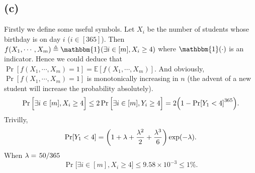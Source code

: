 \documentclass{article}
\begin{document}
\subsection*{(c)}
Firstly we define some useful symbols.
Let $X_i$ be the number of students whose birthday is on day  $i$ ($i\in[365]$). 
Then $f(X_1,\cdots,X_m)\defeq\mathbbm{1}(\exists i\in[m], X_i\ge 4)$ where $\mathbbm{1}(\cdot)$ is an indicator.
Hence we could deduce that $\Pr[f(X_1,\cdots,X_m)=1]=\mathbb{E}[f(X_1,\cdots,X_m)]$.
And obviously, $\Pr[f(X_1,\cdots,X_m)=1]$ is monotonically increasing in $n$ (the advent of a new student will increase the probability absolutely).
\[
	\Pr\Big[\exists i\in[m],X_i\ge 4\Big]
	\le 
	2\Pr\Big[\exists i\in[m],Y_i\ge 4\Big]=2\qty(1-\Pr[Y_1<4]^{365})
.\] 
Trivilly,
\[
	\Pr[Y_1<4]=\qty(1+\lambda+\frac{\lambda^2}{2}+\frac{\lambda^3}{6})\exp(-\lambda)
.\] 
When $\lambda=\flatfrac{50}{365}$
\[
    \Pr\Big[\exists i\in[m],X_i\ge 4\Big]
	\le 9.58\times 10^{-3}\le 1\%
.\] 
\end{document}
